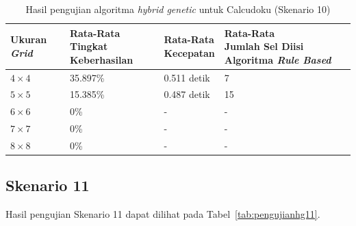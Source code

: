 \begin{table}
\centering
\captionsetup{justification=centering}
\caption[Hasil pengujian algoritma \textit{hybrid genetic} untuk Calcudoku (Skenario 10)]{Hasil pengujian algoritma \textit{hybrid genetic} untuk Calcudoku (Skenario 10)}
\begin{tabular}{| l | l | l | l |}
\hline
Ukuran \textit{Grid} & \makecell[l]{Rata-Rata \\ Tingkat Keberhasilan} & \makecell[l]{Rata-Rata \\ Kecepatan} & \makecell[l]{Rata-Rata \\ Jumlah Sel Diisi Algoritma \textit{Rule Based}} \\
\hline \hline
\begin{math}4 \times 4\end{math} & 35.897\% & 0.511 detik & 7 \\
\hline
\begin{math}5 \times 5\end{math} & 15.385\% & 0.487 detik & 15 \\
\hline
\begin{math}6 \times 6\end{math} & 0\% & - & - \\
\hline
\begin{math}7 \times 7\end{math} & 0\% & - & - \\
\hline
\begin{math}8 \times 8\end{math} & 0\% & - & - \\
\hline
\end{tabular}
\label{tab:pengujianhg10}
\end{table}

\clearpage

\subsection{Skenario 11}
\label{sec:skenario11}

Hasil pengujian Skenario 11 dapat dilihat pada Tabel~\ref{tab:pengujianhg11}.

